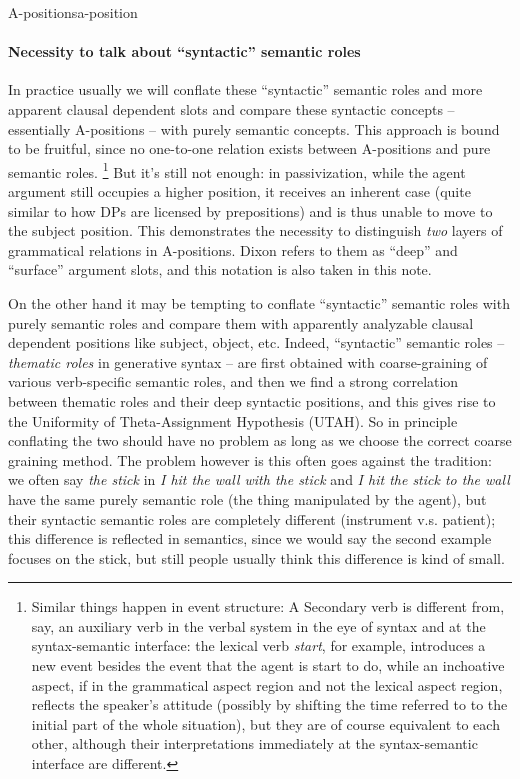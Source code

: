 \documentclass[a4paper, oneside]{report}
\newcommand*{\term}[1]{\emph{#1}}
\newcommand{\form}[1]{\emph{#1}}
\begin{document}
\begin{theorybox}{A-positions}{a-position}
    \paragraph*{Necessity to talk about ``syntactic''  semantic roles} 
    In practice usually we will conflate these ``syntactic'' semantic roles 
    and more apparent clausal dependent slots 
    and compare these syntactic concepts 
    -- essentially A-positions -- with purely semantic concepts.
    This approach is bound to be fruitful, 
    since no one-to-one relation exists between A-positions and pure semantic roles.%
    \footnote{
        Similar things happen in event structure: 
        A Secondary verb is different from, say, an auxiliary verb in the verbal system
        in the eye of syntax 
        and at the syntax-semantic interface:
        the lexical verb \form{start}, for example, 
        introduces a new event besides the event that the agent is start to do, 
        while an inchoative aspect, 
        if in the grammatical aspect region and not the lexical aspect region,
        reflects the speaker's attitude
        (possibly by shifting the time referred to 
        to the initial part of the whole situation),
        but they are of course equivalent to each other,
        although their interpretations 
        immediately at the syntax-semantic interface 
        are different.
    }
    But it's still not enough: in passivization, 
    while the agent argument still occupies a higher position,
    it receives an inherent case (quite similar to how DPs are licensed by prepositions)
    and is thus unable to move to the subject position.
    This demonstrates the necessity to distinguish \emph{two} layers of grammatical relations in A-positions.
    Dixon refers to them as ``deep'' and ``surface'' argument slots, 
    and this notation is also taken in this note.

    On the other hand it may be tempting to conflate 
    ``syntactic'' semantic roles with purely semantic roles 
    and compare them with apparently analyzable clausal dependent positions 
    like subject, object, etc.
    Indeed, ``syntactic'' semantic roles -- \term{thematic roles} in generative syntax -- 
    are first obtained with coarse-graining of 
    various verb-specific semantic roles,
    and then we find a strong correlation between thematic roles 
    and their deep syntactic positions, 
    and this gives rise to the Uniformity of Theta-Assignment Hypothesis (UTAH).
    So in principle conflating the two should have no problem
    as long as we choose the correct coarse graining method.
    The problem however is this often goes against the tradition:
    we often say \form{the stick} in \form{I hit the wall with the stick} and 
    \form{I hit the stick to the wall}
    have the same purely semantic role (the thing manipulated by the agent),
    but their syntactic semantic roles are completely different
    (instrument v.s. patient);
    this difference is reflected in semantics, 
    since we would say the second example focuses on the stick,
    but still people usually think this difference is kind of small.
    

\end{theorybox}
\end{document}
